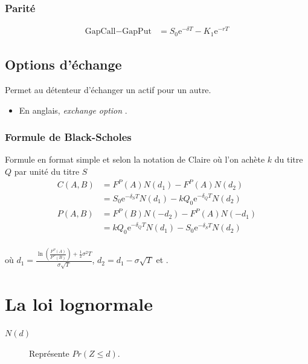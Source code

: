 \documentclass[10pt, french]{article}
\begin{document}
\begin{multicols*}{2}
\subsubsection*{Parité}
\begin{align*}
	\text{GapCall}	-	\text{GapPut}
	&=	S_{0}\textrm{e}^{-\delta T}	-	K_{1}\textrm{e}^{-rT}
\end{align*}

\columnbreak
\subsection{Options d'échange}
\begin{definitionNOHFILL}
Permet au détenteur d'échanger un actif pour un autre.

\tcbline

\begin{itemize}[leftmargin = *]
	\item	En anglais, \og \textit{exchange option} \fg{}.
\end{itemize}
\end{definitionNOHFILL}

\subsubsection*{Formule de Black-Scholes}
Formule en format simple et selon la notation de Claire où l'on achète $k$ du titre $Q$ par unité du titre $S$
\begin{align*}
	C(A, B)
	&=	F^{P}(A)N(d_{1})	-	F^{P}(A)N(d_{2})	\\
	&=	S_{0} \textrm{e}^{-\delta_{S}T}N(d_{1})	-	kQ_{0} \textrm{e}^{-\delta_{Q}T}N(d_{2})	\\
	P(A, B)
	&=	F^{P}(B)N(-d_{2})	-	F^{P}(A)N(-d_{1})	\\
	&=	kQ_{0} \textrm{e}^{-\delta_{Q}T}N(d_{1})	-	S_{0} \textrm{e}^{-\delta_{S}T}N(d_{2})	\\	
\end{align*}

où $d_{1}	=	\frac{\ln\left(\frac{F^{P}(A)}{F^{P}(B)}\right) + \frac{1}{2} \sigma^{2} T}{\sigma \sqrt{T}}$, $d_{2}	=	d_{1} - \sigma \sqrt{T}$ et .


\pagebreak
\setcounter{section}{17}
\section{La loi lognormale}
\label{sec:lognorm}
\begin{distributions}[Notation]
\begin{description}
	\item[$N(d)$]	Représente $Pr(Z \leq d)$.
\end{description}
\end{distributions}



\end{multicols*}
\end{document}
